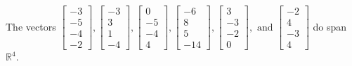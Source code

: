 \begin{exercise}
\begin{exerciseStatement}
  \end{exerciseStatement}
  \begin{exerciseAnswer}
   The vectors \(\left[\begin{array}{r}
-3 \\
-5 \\
-4 \\
-2
\end{array}\right] , \left[\begin{array}{r}
-3 \\
3 \\
1 \\
-4
\end{array}\right] , \left[\begin{array}{r}
0 \\
-5 \\
-4 \\
4
\end{array}\right] , \left[\begin{array}{r}
-6 \\
8 \\
5 \\
-14
\end{array}\right] , \left[\begin{array}{r}
3 \\
-3 \\
-2 \\
0
\end{array}\right] , \text{ and } \left[\begin{array}{r}
-2 \\
4 \\
-3 \\
4
\end{array}\right]\) 
  	 do  
	span \(\mathbb{R}^4\).
  


  \end{exerciseAnswer}
\end{exercise}